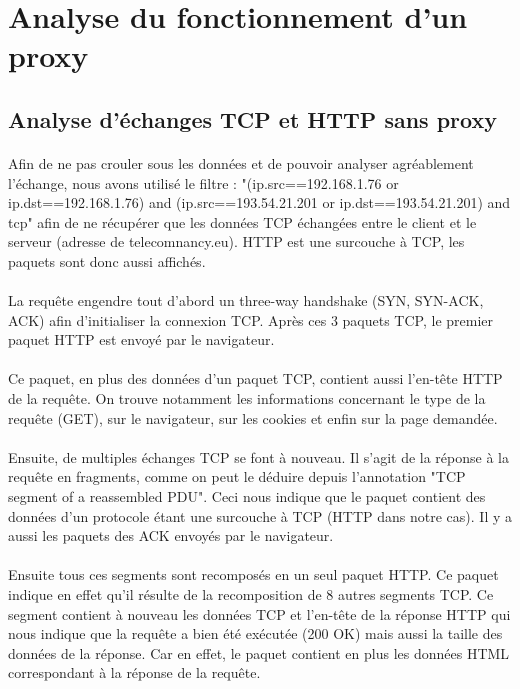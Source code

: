 \section{Analyse du fonctionnement d'un proxy}
\subsection{Analyse d'échanges TCP et HTTP sans proxy}
\paragraph{}
Afin de ne pas crouler sous les données et de pouvoir analyser agréablement l'échange, nous avons utilisé le filtre :
"(ip.src==192.168.1.76 or ip.dst==192.168.1.76) and (ip.src==193.54.21.201 or ip.dst==193.54.21.201) and tcp"
afin de ne récupérer que les données TCP échangées entre le client et le serveur (adresse de telecomnancy.eu). HTTP est une surcouche à TCP, les paquets sont donc aussi affichés.
\paragraph{}
La requête engendre tout d'abord un three-way handshake (SYN, SYN-ACK, ACK) afin d'initialiser la connexion TCP.
Après ces 3 paquets TCP, le premier paquet HTTP est envoyé par le navigateur.
\paragraph{}
Ce paquet, en plus des données d'un paquet TCP, contient aussi l'en-tête HTTP de la requête. On trouve notamment les informations concernant le type de la requête (GET), sur le navigateur, sur les cookies et enfin sur la page demandée. \paragraph{}
Ensuite, de multiples échanges TCP se font à nouveau. Il s'agit de la réponse à la requête en fragments, comme on peut le déduire depuis l'annotation "TCP segment of a reassembled PDU". Ceci nous indique que le paquet contient des données d'un protocole étant une surcouche à TCP (HTTP dans notre cas). Il y a aussi les paquets des ACK envoyés par le navigateur. \paragraph{}
Ensuite tous ces segments sont recomposés en un seul paquet HTTP. Ce paquet indique en effet qu'il résulte de la recomposition de 8 autres segments TCP. Ce segment contient à nouveau les données TCP et l'en-tête de la réponse HTTP qui nous indique que la requête a bien été exécutée (200 OK) mais aussi la taille des données de la réponse. Car en effet, le paquet contient en plus les données HTML correspondant à la réponse de la requête.  \linebreak
